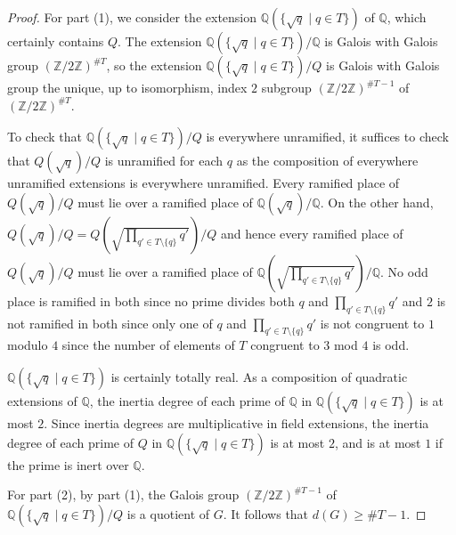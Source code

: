 \documentclass[12pt]{amsart}
\theoremstyle{remark}
\theoremstyle{definition}
\begin{document}
\begin{proof} For part (1), we consider the extension $\mathbb Q( \{\sqrt{q} \mid q \in T\})$ of $\mathbb Q$, which certainly contains $Q$. The extension $\mathbb Q( \{\sqrt{q} \mid q \in T\})/\mathbb Q$ is Galois with Galois group $(\mathbb Z/2\mathbb Z)^{ \#T}$, so the extension  $\mathbb Q( \{\sqrt{q} \mid q \in T\})/Q$ is Galois with Galois group the unique, up to isomorphism, index $2$ subgroup $(\mathbb Z/2\mathbb Z)^{ \#T-1}$ of $(\mathbb Z/2\mathbb Z)^{ \#T}$.

To check that $\mathbb Q( \{\sqrt{q} \mid q \in T\})/Q$ is everywhere unramified, it suffices to check that $Q(\sqrt{q})/Q$ is unramified for each $q$ as the composition of everywhere unramified extensions is everywhere unramified. Every ramified place of $Q(\sqrt{q})/Q$  must lie over a ramified place of $\mathbb Q(\sqrt{q})/\mathbb Q$. On the other hand, $Q(\sqrt{q})/Q=Q(\sqrt{ \prod_{q'\in T\setminus\{q\}} q'})/Q$ and hence every ramified place of $Q(\sqrt{q})/Q$  must lie over a ramified place of $\mathbb Q(\sqrt{ \prod_{q'\in T\setminus\{q\}} q'})/\mathbb Q$. No odd place is ramified in both since no prime divides both $q$ and $\prod_{q'\in T\setminus\{q\}} q'$ and $2$ is not ramified in both since only one of $q$ and $\prod_{q'\in T\setminus\{q\}} q'$ is not congruent to $1$ modulo $4$ since the number of elements of $T$ congruent to $3$ mod $4$ is odd. 

$\mathbb Q( \{\sqrt{q} \mid q \in T\})$ is certainly totally real. As a composition of quadratic extensions of $\mathbb Q$, the inertia degree of each prime of $\mathbb Q$ in $\mathbb Q( \{\sqrt{q} \mid q \in T\})$ is at most $2$. Since inertia degrees are multiplicative in field extensions, the inertia degree of each prime of $Q$ in $\mathbb Q( \{\sqrt{q} \mid q \in T\})$ is at most $2$, and is at most $1$ if the prime is inert over $\mathbb Q$. 


For part (2), by part (1), the Galois group $(\mathbb Z/2\mathbb Z)^{ \#T-1}$ of  $\mathbb Q( \{\sqrt{q} \mid q \in T\})/Q$  is a quotient of $G$. It follows that $d(G) \geq \#T -1$.


\end{proof}
\end{document}
